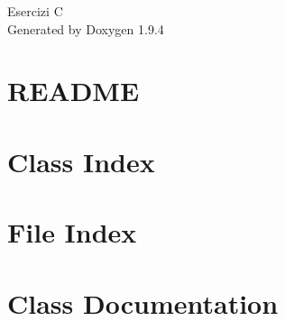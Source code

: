 \documentclass[twoside]{book}
\newcommand{\+}{\discretionary{\mbox{\scriptsize$\hookleftarrow$}}{}{}}
\newcommand{\clearemptydoublepage}{%
    \newpage{\pagestyle{empty}\cleardoublepage}%
  }
\begin{document}
  \raggedbottom
    \hypersetup{pageanchor=false,
                bookmarksnumbered=true,
                pdfencoding=unicode
               }
  \begin{titlepage}
  \vspace*{7cm}
  \begin{center}%
  {\Large Esercizi C}\\
  \vspace*{1cm}
  {\large Generated by Doxygen 1.9.4}\\
  \end{center}
  \end{titlepage}
  \clearemptydoublepage
  \tableofcontents
  \clearemptydoublepage
  \hypersetup{pageanchor=true}
\chapter{README}
\label{md_README}

\chapter{Class Index}

\chapter{File Index}

\chapter{Class Documentation}











\end{document}
